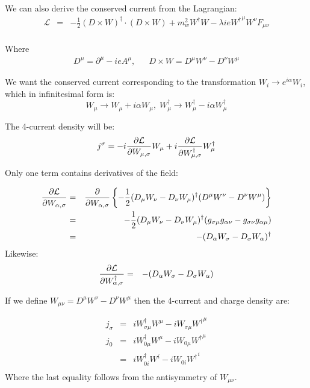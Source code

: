 We can also derive the conserved current from the Lagrangian:
\begin{eqnarray*}
\mathcal{L} 
	&=&	-\frac{1}{2} (D \times W)^\dagger \cdot (D \times W) 
				+ m_w^2 W^\dagger W 
				-\lambda i e {W^\dagger}^\mu W^\nu F_{\mu \nu}	\\
\end{eqnarray*}

Where
\begin{eqnarray*}
		D^\mu	=	\partial^\mu - i e A^\mu ,
	&&
		D \times W = D^\mu W^\nu - D^\nu W^\mu
\end{eqnarray*}


We want the conserved current corresponding to the transformation $ W_i \to e^{i \alpha}W_i $, which in infinitesimal form is:
\begin{equation*}
	W_\mu \to W_\mu + i \alpha W_\mu, \;
	W_\mu^\dagger \to W_\mu^\dagger - i \alpha W_\mu^{\dagger}
\end{equation*}

The 4-current density will be:
\begin{equation*}
j^{\sigma} = -i \frac{\partial \mathcal{L} }{\partial W_{\mu, \sigma}} W_\mu  +  i\frac{\partial \mathcal{L} }{\partial W^\dagger_{\mu, \sigma}} W^\dagger_\mu
\end{equation*}

Only one term contains derivatives of the field:

\begin{eqnarray*}
 \frac{\partial \mathcal{L} }{\partial W_{\alpha, \sigma}} 
		&=& \frac{\partial }{\partial W_{\alpha, \sigma}} \left \{ - \frac{1}{2} (D_\mu W_\nu - D_\nu W_\mu)^\dagger(D^\mu W^\nu - D^\nu W^\mu) \right \}\\
		&=& - \frac{1}{2} (D_\mu W_\nu - D_\nu W_\mu)^\dagger (g_{\sigma \mu} g_{\alpha \nu} - g_{\sigma \nu}g_{\alpha \mu})\\
		&=& - (D_\alpha W_\sigma - D_\sigma W_\alpha)^\dagger
\end{eqnarray*}
Likewise:
\begin{eqnarray*}
	\frac{\partial \mathcal{L} }{\partial W_{\alpha, \sigma}^\dagger} 
		&=& - (D_\alpha W_\sigma - D_\sigma W_\alpha)
\end{eqnarray*}

If  we define $W_{\mu \nu} =  D^\mu W^\nu - D^\nu W^\mu$ then the 4-current and charge density are:

\begin{eqnarray*}
	j_\sigma &=& i W_{\sigma \mu}^\dagger W^{\mu} - i W_{\sigma \mu} {W^{\dagger}}^\mu \\
	j_0 	&=& i W_{0 \mu}^\dagger W^{\mu} - i W_{0 \mu} {W^{\dagger}}^\mu \\
		&=& i W_{0 i}^\dagger W^i - i W_{0 i} {W^{\dagger}}^i \\
\end{eqnarray*}
Where the last equality follows from the antisymmetry of $W_{\mu \nu}$.

